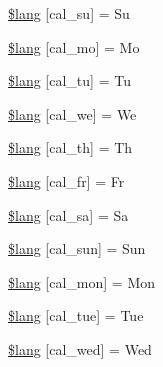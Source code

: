 \begin{DoxyCompactItemize}
\item 
\mbox{\hyperlink{calendar__lang_8php_a2658243eff69e113a0e04a5b99e460c5}{\$lang}} \mbox{[}\textquotesingle{}cal\+\_\+su\textquotesingle{}\mbox{]} = \textquotesingle{}Su\textquotesingle{}
\item 
\mbox{\hyperlink{calendar__lang_8php_a1f9e709a44afce9a57157e6690fea106}{\$lang}} \mbox{[}\textquotesingle{}cal\+\_\+mo\textquotesingle{}\mbox{]} = \textquotesingle{}Mo\textquotesingle{}
\item 
\mbox{\hyperlink{calendar__lang_8php_a5c6f65fa28ce0cfba854143b7d6791a6}{\$lang}} \mbox{[}\textquotesingle{}cal\+\_\+tu\textquotesingle{}\mbox{]} = \textquotesingle{}Tu\textquotesingle{}
\item 
\mbox{\hyperlink{calendar__lang_8php_a665558e7ced8856da101496aae070447}{\$lang}} \mbox{[}\textquotesingle{}cal\+\_\+we\textquotesingle{}\mbox{]} = \textquotesingle{}We\textquotesingle{}
\item 
\mbox{\hyperlink{calendar__lang_8php_ae0e6a6298990150a03c6b6ac865c0b8e}{\$lang}} \mbox{[}\textquotesingle{}cal\+\_\+th\textquotesingle{}\mbox{]} = \textquotesingle{}Th\textquotesingle{}
\item 
\mbox{\hyperlink{calendar__lang_8php_a768a3d350ee6be1c25bf941e59875d7e}{\$lang}} \mbox{[}\textquotesingle{}cal\+\_\+fr\textquotesingle{}\mbox{]} = \textquotesingle{}Fr\textquotesingle{}
\item 
\mbox{\hyperlink{calendar__lang_8php_ac4d361c0c9626a2c82f8c6c28dcaebfc}{\$lang}} \mbox{[}\textquotesingle{}cal\+\_\+sa\textquotesingle{}\mbox{]} = \textquotesingle{}Sa\textquotesingle{}
\item 
\mbox{\hyperlink{calendar__lang_8php_aa5c527a9a5d3fb2ac58845a5d3bc95f4}{\$lang}} \mbox{[}\textquotesingle{}cal\+\_\+sun\textquotesingle{}\mbox{]} = \textquotesingle{}Sun\textquotesingle{}
\item 
\mbox{\hyperlink{calendar__lang_8php_acc316d0fc12362ea0e8ca331d865a7e5}{\$lang}} \mbox{[}\textquotesingle{}cal\+\_\+mon\textquotesingle{}\mbox{]} = \textquotesingle{}Mon\textquotesingle{}
\item 
\mbox{\hyperlink{calendar__lang_8php_a647c087563610b574e226fef9e825ee1}{\$lang}} \mbox{[}\textquotesingle{}cal\+\_\+tue\textquotesingle{}\mbox{]} = \textquotesingle{}Tue\textquotesingle{}
\item 
\mbox{\hyperlink{calendar__lang_8php_a16288f487a1e9545fd4028a87a08860e}{\$lang}} \mbox{[}\textquotesingle{}cal\+\_\+wed\textquotesingle{}\mbox{]} = \textquotesingle{}Wed\textquotesingle{}

\end{DoxyCompactItemize}
